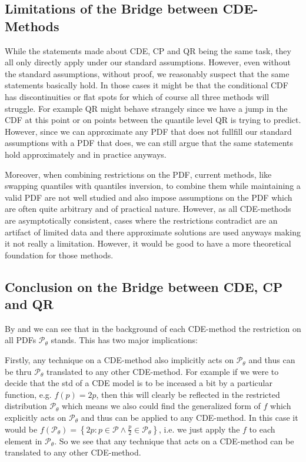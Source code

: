 \subsection{Limitations of the Bridge between CDE-Methods}

While the statements made about CDE, CP and QR being the same task, they all only directly apply under our standard assumptions. However, even without the standard assumptions, without proof, we reasonably suspect that the same statements basically hold. In those cases it might be that the conditional CDF has discontinuities or flat spots for which of course all three methods will struggle. For example QR might behave strangely since we have a jump in the CDF at this point or on points between the quantile level QR is trying to predict. However, since we can approximate any PDF that does not fullfill our standard assumptions with a PDF that does, we can still argue that the same statements hold approximately and in practice anyways.

Moreover, when combining restrictions on the PDF, current methods, like swapping quantiles with quantiles inversion, to combine them while maintaining a valid PDF are not well studied and also impose assumptions on the PDF which are often quite arbitrary and of practical nature. However, as all CDE-methods are asymptotically consistent, cases where the restrictions contradict are an artifact of limited data and there approximate solutions are used anyways making it not really a limitation. However, it would be good to have a more theoretical foundation for those methods.

\subsection{Conclusion on the Bridge between CDE, CP and QR}

By  and  we can see that in the background of each CDE-method the restriction on all PDFs $\mathcal{P}_\theta$ stands. This has two major implications:

Firstly, any technique on a CDE-method also implicitly acts on $\mathcal{P}_\theta$ and thus can be thru $\mathcal{P}_\theta$ translated to any other CDE-method. For example if we were to decide that the std of a CDE model is to be inceased a bit by a particular function, e.g. $f(p) = 2 p $, then this will clearly be reflected in the restricted distribution $\mathcal{P}_\theta$ which means we also could find the generalized form of $f$ which explicitly acts on $\mathcal{P}_\theta$ and thus can be applied to any CDE-method. In this case it would be $f(\mathcal{P}_{\theta}) = \left\{2 p: p \in \mathcal{P} \land \frac{p}{2} \in \mathcal{P}_\theta \right\}$, i.e. we just apply the $f$ to each element in $\mathcal{P}_\theta$. So we see that any technique that acts on a CDE-method can be translated to any other CDE-method.

